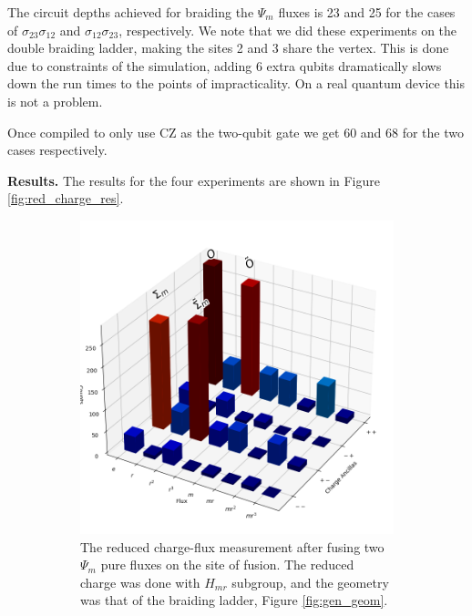 \documentclass[two column]{article}
\begin{document}
The circuit depths achieved for braiding the $\Psi_m$ fluxes is 23 and 25 for the cases of $\sigma_{23}\sigma_{12}$ and $\sigma_{12}\sigma_{23}$, respectively. We note that we did these experiments on the double braiding ladder, making the sites 2 and 3 share the vertex. This is done due to constraints of the simulation, adding 6 extra qubits dramatically slows down the run times to the points of impracticality. On a real quantum device this is not a problem.

Once compiled to only use CZ as the two-qubit gate we get 60 and 68 for the two cases respectively.

\textbf{Results.}
The results for the four experiments are shown in Figure \ref{fig:red_charge_res}.
\begin{figure}
\centering
\begin{subfigure}{0.47\textwidth}
    \includegraphics[width = \linewidth]{Figures/fusion_glasses.png}
    \caption{The reduced charge-flux measurement after fusing two $\Psi_m$ pure fluxes on the site of fusion. The reduced charge was done with $H_{mr}$ subgroup, and the geometry was that of the braiding ladder, Figure \ref{fig:gen_geom}.}
    \label{fig:fusion_glass}
\end{subfigure}\hfill
\begin{subfigure}{0.47\textwidth}

\end{subfigure}
\end{figure}
\end{document}
